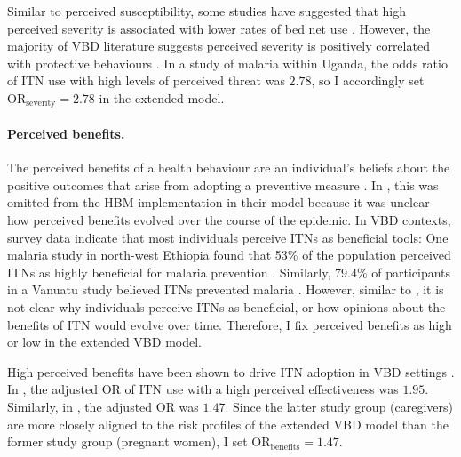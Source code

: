 Similar to perceived susceptibility, some studies have suggested that high perceived severity is associated with lower rates of bed net use \cite{storey_associations_2018, babalola_factors_2018}. However, the majority of VBD literature suggests perceived severity is positively correlated with protective behaviours \cite{kakaire_role_2023, raude_public_2012, watanabe_determinants_2014, naserrudin_role_2022}. In a study of malaria within Uganda, the odds ratio of ITN use with high levels of perceived threat was $2.78$, so I accordingly set $\text{OR}_{\text{severity}}=2.78$ in the extended model.

\paragraph{Perceived benefits.}The perceived benefits of a health behaviour are an individual's beliefs about the positive outcomes that arise from adopting a preventive measure \cite{champion_health_2015}. In \citet{durham_incorporating_2012}, this was omitted from the HBM implementation in their model because it was unclear how perceived benefits evolved over the course of the epidemic. In VBD contexts, survey data indicate that most individuals perceive ITNs as beneficial tools: One malaria study in north-west Ethiopia found that 53\% of the population perceived ITNs as highly beneficial for malaria prevention \cite{yirsaw_insecticide-treated_2021}. Similarly, 79.4\% of participants in a Vanuatu study believed ITNs prevented malaria \cite{watanabe_determinants_2014}. However, similar to \citet{durham_incorporating_2012}, it is not clear why individuals perceive ITNs as beneficial, or how opinions about the benefits of ITN would evolve over time. Therefore, I fix perceived benefits as high or low in the extended VBD model.

High perceived benefits have been shown to drive ITN adoption in VBD settings \cite{babalola_factors_2018, storey_associations_2018, kakaire_role_2023}. In \citet{kakaire_role_2023}, the adjusted OR of ITN use with a high perceived effectiveness was $1.95$. Similarly, in \citet{babalola_factors_2018}, the adjusted OR was $1.47$. Since the latter study group (caregivers) are more closely aligned to the risk profiles of the extended VBD model than the former study group (pregnant women), I set $\text{OR}_{\text{benefits}}=1.47$.

